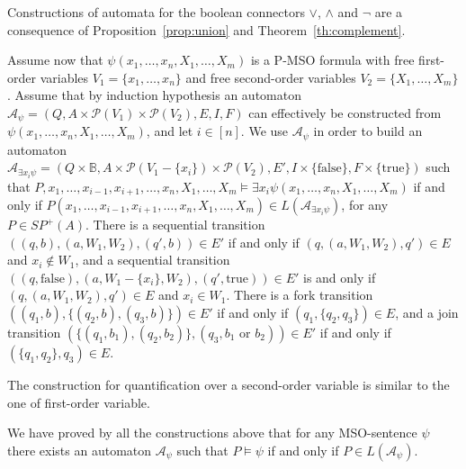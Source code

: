 \documentclass{CSML}
\newcommand{\true}{\text{true}}
\newcommand{\false}{\text{false}}
\begin{document}
Constructions of automata for the boolean connectors $\lor$, $\land$ and $\lnot$ are a consequence of Proposition~\ref{prop:union} and Theorem~\ref{th:complement}.

Assume now that $\psi(x_1,\dots,x_n,X_1,\dots,X_m)$ is a P-MSO formula with free first-order variables $V_1=\{x_1,\dots,x_n\}$ and free second-order variables $V_2=\{X_1,\dots,X_m\}$.  Assume that by induction hypothesis an automaton $\mathcal{A}_{\psi}=(Q,A\times{\mathcal P}(V_1)\times{\mathcal P}(V_2),E,I,F)$ can effectively be constructed from $\psi(x_1,\dots,x_n,X_1,\dots,X_m)$, and let $i\in[n]$.
We use $\mathcal{A}_{\psi}$ in order to build an automaton $\mathcal{A}_{\exists x_i\psi}=(Q\times\mathbb{B},A\times{\mathcal P}(V_1-\{x_i\})\times{\mathcal P}(V_2),E',I\times\{\false\},F\times\{\true\})$ such that $P,x_1,\dots,x_{i-1},x_{i+1},\dots,x_n,X_1,\dots,X_m\models\exists x_i\psi(x_1,\dots,x_n,X_1,\dots,X_m)$ if and only if $P(x_1,\dots,x_{i-1},x_{i+1},\dots,x_n,X_1,\dots,X_m)\in L(\mathcal{A}_{\exists x_i\psi})$, for any $P\in SP^+(A)$. There is a sequential transition $((q,b),(a,W_1,W_2),(q',b))\in E'$ if and only if $(q,(a,W_1,W_2),q')\in E$ and $x_i\not\in W_1$, and a sequential transition $((q,\false),(a,W_1-\{x_i\},W_2),(q',\true))\in E'$ is and only if $(q,(a,W_1,W_2),q')\in E$ and $x_i\in W_1$. There is a fork transition $((q_1,b),\{(q_2,b),(q_3,b)\})\in E'$ if and only if $(q_1,\{q_2,q_3\})\in E$, and a join transition $(\{(q_1,b_1),(q_2,b_2)\},(q_3,b_1\text{ or } b_2))\in E'$ if and only if $(\{q_1,q_2\},q_3)\in E$.

The  construction for quantification over a second-order variable is similar to the one of first-order variable.

\begin{rem}
  \label{rem:MSOAuto}
  We have proved by all the constructions above that for any MSO-sentence $\psi$ there exists an automaton $\mathcal{A}_\psi$ such that $P\models\psi$ if and only if $P\in L(\mathcal{A}_\psi)$.
\end{rem}
\end{document}
